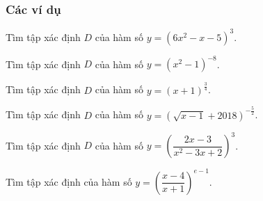 \subsubsection{Các ví dụ}
\begin{vd}%
	Tìm tập xác định $D$ của hàm số $y=\left(6x^2-x-5\right)^3$.
\end{vd}
\begin{vd}%
	Tìm tập xác định $D$ của hàm số $y=\left(x^2-1\right)^{-8}$.
\end{vd}
\begin{vd}%
	Tìm tập xác định $D$ của hàm số $y=(x+1)^{\tfrac{3}{4}}$.
\end{vd}
\begin{vd}%
	Tìm tập xác định $D$ của hàm số $y=\left(\sqrt{x-1}+2018\right)^{-\tfrac{5}{2}}$.
\end{vd}
\begin{vd}%
	Tìm tập xác định $D$ của hàm số $y=\left(\dfrac{2x-3}{x^2-3x+2}\right)^3$.
\end{vd}
\begin{vd}%
	Tìm tập xác định của hàm số $y=\left(\dfrac{x-4}{x+1}\right)^{e-1}$.
\end{vd}
